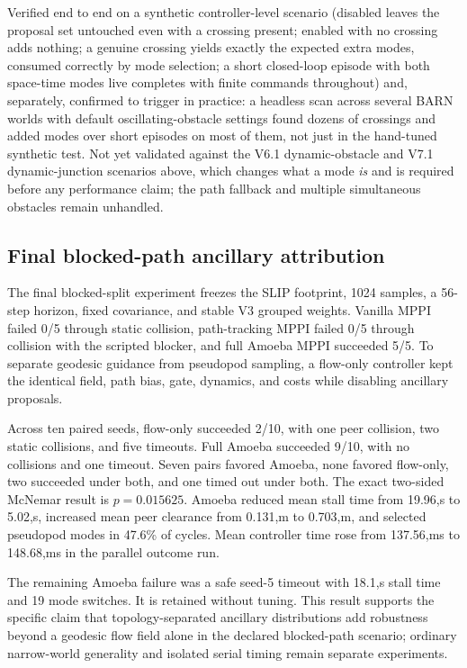 \documentclass[11pt,a4paper]{article}
\begin{document}
Verified end to end on a synthetic controller-level scenario (disabled
leaves the proposal set untouched even with a crossing present; enabled with
no crossing adds nothing; a genuine crossing yields exactly the expected
extra modes, consumed correctly by mode selection; a short closed-loop
episode with both space-time modes live completes with finite commands
throughout) and, separately, confirmed to trigger in practice: a headless
scan across several BARN worlds with default oscillating-obstacle settings
found dozens of crossings and added modes over short episodes on most of
them, not just in the hand-tuned synthetic test. Not yet validated against
the V6.1 dynamic-obstacle and V7.1 dynamic-junction scenarios above, which
changes what a mode \emph{is} and is required before any performance claim;
the path fallback and multiple simultaneous obstacles remain unhandled.

\subsection{Final blocked-path ancillary attribution}

The final blocked-split experiment freezes the SLIP footprint, 1024 samples,
a 56-step horizon, fixed covariance, and stable V3 grouped weights. Vanilla
MPPI failed 0/5 through static collision, path-tracking MPPI failed 0/5 through
collision with the scripted blocker, and full Amoeba MPPI succeeded 5/5. To
separate geodesic guidance from pseudopod sampling, a flow-only controller kept
the identical field, path bias, gate, dynamics, and costs while disabling
ancillary proposals.

Across ten paired seeds, flow-only succeeded 2/10, with one peer collision,
two static collisions, and five timeouts. Full Amoeba succeeded 9/10, with no
collisions and one timeout. Seven pairs favored Amoeba, none favored flow-only,
two succeeded under both, and one timed out under both. The exact two-sided
McNemar result is $p=0.015625$. Amoeba reduced mean stall time from 19.96,s to
5.02,s, increased mean peer clearance from 0.131,m to 0.703,m, and selected
pseudopod modes in 47.6\% of cycles. Mean controller time rose from 137.56,ms
to 148.68,ms in the parallel outcome run.

The remaining Amoeba failure was a safe seed-5 timeout with 18.1,s stall time
and 19 mode switches. It is retained without tuning. This result supports the
specific claim that topology-separated ancillary distributions add robustness
beyond a geodesic flow field alone in the declared blocked-path scenario;
ordinary narrow-world generality and isolated serial timing remain separate
experiments.
\end{document}
